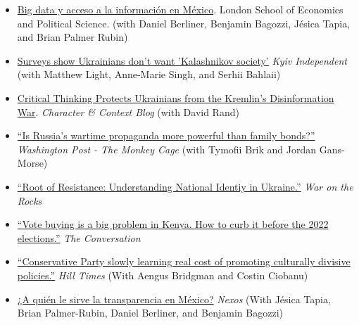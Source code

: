 \documentclass[margin,line]{res}
\begin{document}
\begin{itemize}[label={--}]

 \item \href{//osf.io/nbqus/.}{Big data y acceso a la información en México}. London School of Economics and Political Science. (with Daniel Berliner, Benjamin Bagozzi, Jésica Tapia, and Brian Palmer Rubin)

\item \href{https://kyivindependent.com/group-of-authors-surveys-show-ukrainians-dont-want-kalashnikov-society/}{Surveys show Ukrainians don't want 'Kalashnikov society'} \emph{Kyiv Independent} (with Matthew Light, Anne-Marie Singh, and Serhii Bahlaii)

\item \href{https://spsp.org/news/character-and-context-blog/erlich-rand-critical-thinking-disinformation}{Critical Thinking Protects Ukrainians from the Kremlin's Disinformation War}. \emph{Character \& Context Blog} (with David Rand)

\item \href{https://www.washingtonpost.com/politics/2022/06/20/russia-ukraine-relatives-conversations-propaganda/}{``Is Russia's wartime propaganda more powerful than family bonds?''} \emph{Washington Post - The Monkey Cage} (with Tymofii Brik and Jordan Gans-Morse)

  \item \href{https://warontherocks.com/2022/04/roots-of-the-resistance-understanding-national-identity-in-ukraine/}{``Root of Resistance: Understanding National Identiy in Ukraine.''} \emph{War on the Rocks}

 \item \href{https://theconversation.com/vote-buying-is-a-big-problem-in-kenya-how-to-curb-it-before-the-2022-elections-171630}{``Vote buying is a big problem in Kenya. How to curb it before the 2022 elections.''} \emph{The Conversation}

\item \href{https://www.hilltimes.com/2021/06/30/conservative-party-slowly-learning-real-cost-of-promoting-culturally-divisive-policies/303970}{``Conservative Party slowly learning real cost of promoting culturally divisive policies.''} \emph{Hill Times} (With Aengus Bridgman and Costin Ciobanu)

\item \href{https://redaccion.nexos.com.mx/a-quien-le-sirve-la-transparencia-en-mexico/}{¿A quién le sirve la transparencia en México?} \emph{Nexos} (With Jésica Tapia, Brian Palmer-Rubin, Daniel Berliner, and Benjamin Bagozzi)


\end{itemize}
\end{document}
